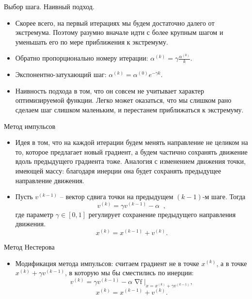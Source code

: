 \documentclass[9pt]{beamer}
\begin{document}
\begin{frame}{Выбор шага. Наивный подход.}
    \begin{itemize}
        \item Скорее всего, на первый итерациях мы будем достаточно далего от экстремума. Поэтому разумно вначале идти с более крупным шагом и уменьшать его по мере приближения к экстремуму.
        \item Обратно пропорционально номеру итерации: $\alpha^{(k)} = \gamma\frac{\alpha^{(0)}}{k}$.
        \item Экспонентно-затухающий шаг: $\alpha^{(k)} = \alpha^{(0)}e^{-\gamma k}$.
        \item Наивность подхода в том, что он совсем не учитывает характер оптимизируемой функции. Легко может оказаться, что мы слишком рано сделаем шаг слишком маленьким, и перестанем приближаться к экстремуму.
    \end{itemize}
\end{frame}

\begin{frame}{Метод импульсов}
\begin{itemize}
    \item Идея в том, что на каждой итерации будем менять направление не целиком на то, которое предлагает новый градиент, а будем частично сохранять движение вдоль предыдущего градиента тоже. Аналогия с изменением движения точки, имеющей массу: благодаря инерции она будет сохранять предыдущее направление движения.
    \item Пусть $v^{(k-1)}$ -- вектор сдвига точки на предыдущем $(k-1)$-м шаге. Тогда 
    $$v^{(k)} = \gamma v^{(k-1)} - \alpha \mathop{\nabla^{(k)}},$$
    где параметр $\gamma \in [0, 1]$ регулирует сохранение предыдущего направления движения.
    $$x^{(k)} = x^{(k-1)} + v^{(k)}.$$
\end{itemize}
\end{frame}

\begin{frame}{Метод Нестерова}
\begin{itemize}
    \item Модификация метода импульсов: считаем градиент не в точке $x^{(k)}$, а в точке $x^{(k)} + \gamma v^{(k-1)}$, в которую мы бы сместились по инерции:
    $$v^{(k)} = \gamma v^{(k-1)} - \alpha \mathop{\nabla f(x)} \Big|_{x=x^{(k)} + \gamma v^{(k-1)}},$$
    $$x^{(k)} = x^{(k-1)} + v^{(k)}.$$
\end{itemize}
\end{frame}
\end{document}

